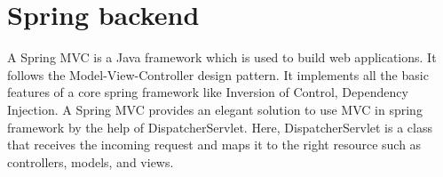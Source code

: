 \section{Spring backend}

A Spring MVC is a Java framework which is used to build web applications. It follows the Model-View-Controller design pattern. It implements all the basic features of a core spring framework like Inversion of Control, Dependency Injection.
A Spring MVC provides an elegant solution to use MVC in spring framework by the help of DispatcherServlet. Here, DispatcherServlet is a class that receives the incoming request and maps it to the right resource such as controllers, models, and views.




